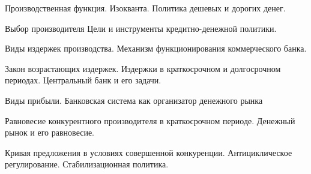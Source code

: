 \documentclass[
	14pt,
	a4paper,
	]
	{scrartcl}
\begin{document}
\vfill

\newpage


\shapk
{}
\setcounter{zad}{0}

\vfill
\z 	Производственная функция. Изокванта.
 \vfill
\z 	Политика дешевых и дорогих денег.
 \vfill

\vfill

\newpage


\shapk
{}
\setcounter{zad}{0}

\vfill
\z 	Выбор производителя
 \vfill
\z 	Цели и инструменты кредитно-денежной политики.
 \vfill

\vfill

\newpage


\shapk
{}
\setcounter{zad}{0}

\vfill
\z 	Виды издержек производства.
 \vfill
\z 	Механизм функционирования коммерческого банка.
 \vfill

\vfill

\newpage


\shapk
{}
\setcounter{zad}{0}

\vfill
\z 	Закон возрастающих издержек.  Издержки в краткосрочном и долгосрочном периодах.
 \vfill
\z 	Центральный банк и его задачи.
 \vfill

\vfill

\newpage


\shapk
{}
\setcounter{zad}{0}

\vfill
\z 	Виды прибыли.
 \vfill
\z 	Банковская система как организатор денежного рынка
 \vfill

\vfill

\newpage


\shapk
{}
\setcounter{zad}{0}

\vfill
\z 	Равновесие конкурентного производителя в краткосрочном периоде.
 \vfill
\z 	Денежный рынок и его равновесие.
 \vfill

\vfill

\newpage


\shapk
{}
\setcounter{zad}{0}

\vfill
\z 	Кривая предложения в условиях совершенной конкуренции.
 \vfill
\z 	Антициклическое регулирование. Стабилизационная политика.
 \vfill

\vfill

\newpage


\shapk
{}
\setcounter{zad}{0}
\end{document}
